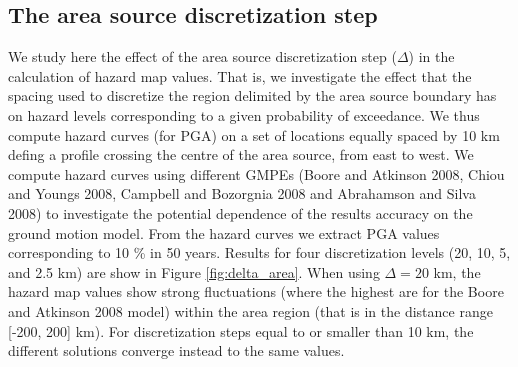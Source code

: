 \subsection{The area source discretization step}
We study here the effect of the area source discretization step ($\Delta$) in the calculation of hazard map values. That is, we investigate the effect that the spacing used to discretize the region delimited by the area
source boundary has on hazard levels corresponding to a given probability of exceedance. We thus compute
hazard curves (for PGA) on a set of locations equally spaced by 10 km defing a profile crossing the centre of the area source, from east to west.
We compute hazard curves using different GMPEs (Boore and Atkinson 2008, Chiou and Youngs
2008, Campbell and Bozorgnia 2008 and Abrahamson and Silva 2008) to investigate the potential dependence of the results accuracy on the ground motion model. From the hazard curves we extract PGA values corresponding to 10 \% in 50 years. Results for four discretization levels (20, 10, 5, and 2.5 km) are show in
Figure \ref{fig:delta_area}. When using $\Delta=20$ km, the hazard map values show strong fluctuations
 (where the highest are for the Boore and Atkinson 2008 model) within the area region (that is in the distance
range [-200, 200] km). For discretization steps equal to or smaller than 10 km, the different solutions converge instead to the same values.
